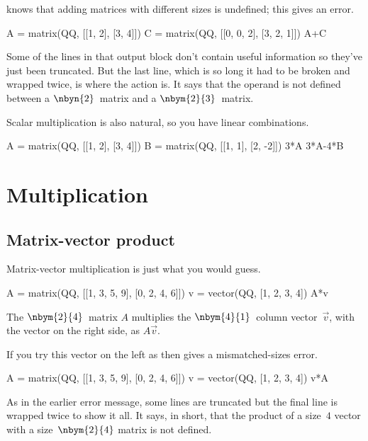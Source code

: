 \Sage{} knows that adding matrices with different sizes is undefined; 
this gives an error. 
\begin{sageoutput}[s,3,70,-66;s,4,70,-66;s,8,70,-66;s,10,70,-66;s,12,124,14;s,12,70,13]
A = matrix(QQ, [[1, 2], [3, 4]])
C = matrix(QQ, [[0, 0, 2], [3, 2, 1]])
A+C
\end{sageoutput}
\noindent
Some of the lines in that output block don't contain useful information so 
they've just been truncated.
But the last line, which is so long it had to be broken and wrapped 
twice, is where the action is.
It says that the \inlinecode{+} operand is not defined between a
$\nbyn{2}$~matrix and a $\nbym{2}{3}$~matrix.

Scalar multiplication is also natural,
so you have linear combinations.
\begin{sageoutput}[d,0,2]
A = matrix(QQ, [[1, 2], [3, 4]])
B = matrix(QQ, [[1, 1], [2, -2]])
3*A
3*A-4*B
\end{sageoutput}



\section{Multiplication}

\subsection{Matrix-vector product}
Matrix-vector multiplication is just what you would guess.
\begin{sageoutput}
A = matrix(QQ, [[1, 3, 5, 9], [0, 2, 4, 6]])
v = vector(QQ, [1, 2, 3, 4])
A*v
\end{sageoutput}
\noindent
The $\nbym{2}{4}$~matrix $A$ multiplies the 
$\nbym{4}{1}$~column vector~$\vec{v}$, with the vector on the right side,
as $A\vec{v}$.

If you try this vector on the left as 
 then \Sage{} gives a mismatched-sizes error.
\begin{sageoutput}[s,3,70,-66;s,4,70,-66;s,8,70,-66;s,10,70,-66;s,12,121,16;s,12,67,17]
A = matrix(QQ, [[1, 3, 5, 9], [0, 2, 4, 6]])
v = vector(QQ, [1, 2, 3, 4])
v*A
\end{sageoutput}
\noindent
As in the earlier error message, 
some lines are truncated but the final line is wrapped 
twice to show it all.
It says, in short, that the product of a size~$4$ vector with
a size~$\nbym{2}{4}$ matrix is not defined.

